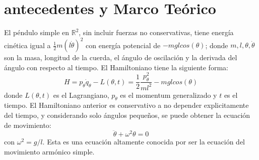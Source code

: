 \documentclass[aps,twocolumn,secnumarabic,nobalancelastpage,amsmath,amssymb,nofootinbib]{revtex4-1}
\begin{document}
	\section{antecedentes y Marco Te\'orico}
		El p\'endulo simple en $\mathbb{R}^2$, sin incluir fuerzas no conservativas, tiene energ\'ia cin\'etica igual a $\frac{1}{2}m(l{\dot{\theta}})^2$ con energ\'ia potencial de $-mglcos(\theta)$; donde $m, l, \theta, {\dot{\theta}}$ son la masa, longitud de la cuerda, el \'angulo de oscilaci\'on y la derivada del \'angulo con respecto al tiempo. El Hamiltoniano tiene la siguiente forma:	
		\begin{equation}
			H = p_\theta \dot{q}_\theta-L(\theta,t) = \frac{1}{2}\frac{p_\theta^2}{ml^2}-mglcos(\theta) 
			\label{HamiltonianoCon}
		\end{equation}
		\noindent donde $L(\theta,t)$ es el Lagrangiano, $p_\theta$ es el momentum generalizado y $t$ es el tiempo. El Hamiltoniano anterior es conservativo a no depender explicitamente del tiempo\cite{taylor2005classical}, y considerando solo \'angulos pequeños, se puede obtener la ecuaci\'on de movimiento:	
		\begin{equation}
			\ddot{\theta} + \omega^2\theta	= 0
		\end{equation}    	
		\noindent con $\omega^2=g/l$. Esta es una ecuaci\'on altamente conocida por ser la ecuaci\'on del movimiento arm\'onico simple\cite{morin2008introduction}. \\	
\end{document}
